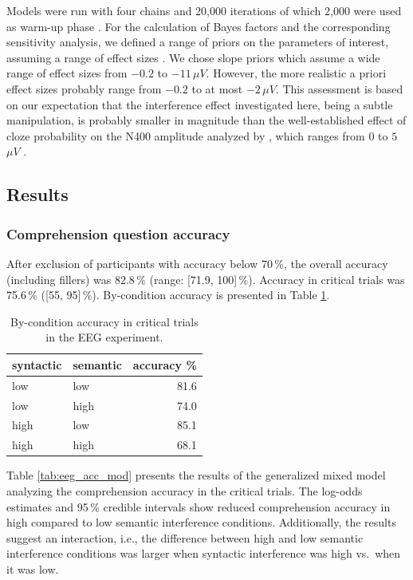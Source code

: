 \documentclass[a4paper, man, floatsintext]{apa7}
\begin{document}
Models were run with four chains and 20,000 iterations of which 2,000 were used as warm-up phase \citep{schad_etal_2022_BF}. For the calculation of Bayes factors and the corresponding sensitivity analysis, we defined a range of priors on the parameters of interest, assuming a range of effect sizes \citep{nicenboim_stats}. We chose slope priors which assume a wide range of effect sizes from $-0.2$ to $-11$\,$\mu V$. However, the more realistic a priori effect sizes probably range from $-0.2$ to at most $-2$\,$\mu V$. This assessment is based on our expectation that the interference effect investigated here, being a subtle manipulation, is probably smaller in magnitude than the well-established  effect of cloze probability on the N400 amplitude analyzed by \textcite{nicenboim_stats}, which ranges from $0$ to $5$\,$\mu V$ \parencite[see section 5.2.5][]{nicenboim_stats}.

\subsection{Results}
\subsubsection{Comprehension question accuracy}
After exclusion of participants with accuracy below 70\,\%, the overall accuracy (including fillers) was 82.8\,\% (range: [71.9, 100]\,\%). Accuracy in critical trials was 75.6\,\% ([55, 95]\,\%). By-condition accuracy is presented in Table \ref{tab:eeg_acc}. 

\begin{table}[]
    \caption{By-condition accuracy in critical trials in the EEG experiment.}
    \label{tab:eeg_acc}
    \centering
    \begin{tabular}{llr}
    \toprule
    syntactic & semantic & accuracy \%\\
    \midrule
        low &  low & 81.6\\
        low &  high & 74.0\\
        high &  low & 85.1\\
        high &  high & 68.1\\
    \bottomrule
    \end{tabular}
\end{table}

Table \ref{tab:eeg_acc_mod} presents the results of the generalized mixed model analyzing the comprehension accuracy in the critical trials. The log-odds estimates and 95\,\% credible intervals show reduced comprehension accuracy in high compared to low semantic interference conditions. Additionally, the results suggest an interaction, i.e., the difference between high and low semantic interference conditions was larger when syntactic interference was high vs.\ when it was low.
\end{document}
